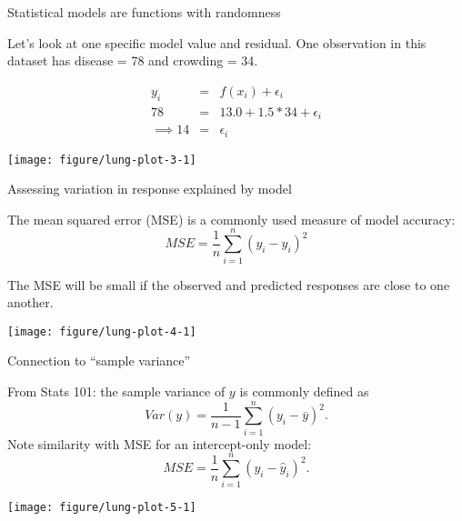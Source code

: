 \documentclass[table]{beamer}\usepackage[]{graphicx}\usepackage[]{color}
\makeatletter
\def\maxwidth{ %
  \ifdim\Gin@nat@width>\linewidth
    \linewidth
  \else
    \Gin@nat@width
  \fi
}
\newenvironment{knitrout}{}{} %
\makeatother
\begin{document}

\begin{frame}[fragile]{Statistical models are functions with randomness}


Let's look at one specific model value and residual. One observation in this dataset has disease = 78 and crowding = 34.

\begin{eqnarray*}
y_i & = & f(x_i) + \epsilon_i  \\
78  & = & 13.0 + 1.5*34 + \epsilon_i\\
\implies 14 & = &  \epsilon_i
\end{eqnarray*}

\begin{knitrout}\footnotesize
{}\color{fgcolor}
\texttt{[image: figure/lung-plot-3-1]} 
\end{knitrout}

\end{frame}




\begin{frame}{Assessing variation in response explained by model}

\bi
\myitem The {\color{orange} mean squared error (MSE)} is a commonly used measure of model accuracy:
$$MSE = \frac{1}{n} \sum_{i=1}^n \left(y_i -\hat y_i\right)^2$$

\myitem The MSE will be small if the observed and predicted responses are close to one another.
\ei

\begin{knitrout}\footnotesize
{}\color{fgcolor}
\texttt{[image: figure/lung-plot-4-1]} 
\end{knitrout}


\end{frame}


\begin{frame}{Connection to ``sample variance''}

From Stats 101: the sample variance of $y$ is commonly defined as
$$Var(y) = \frac{1}{n-1} \sum_{i=1}^n \left(y_i -\bar y\right)^2.$$
Note similarity with MSE for an intercept-only model:
$$MSE = \frac{1}{n} \sum_{i=1}^n \left(y_i -\hat y_i\right)^2.$$


\begin{knitrout}\footnotesize
{}\color{fgcolor}
\texttt{[image: figure/lung-plot-5-1]} 
\end{knitrout}

\end{frame}
\end{document}
